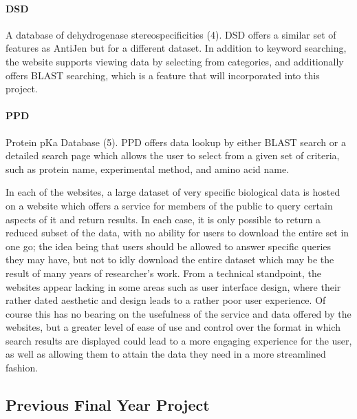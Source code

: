 \documentclass[12pt,a4paper]{article}
\begin{document}
\paragraph{DSD} A database of dehydrogenase stereospecificities (4). DSD offers
a similar set of features as AntiJen but for a different dataset. In addition to
keyword searching, the website supports viewing data by selecting from
categories, and additionally offers BLAST searching, which is a feature that
will incorporated into this project.

\paragraph{PPD} Protein pKa Database (5). PPD offers data lookup by either
BLAST search or a detailed search page which allows the user to select from a
given set of criteria, such as protein name, experimental method, and amino acid
name.

In each of the websites, a large dataset of very specific biological data is
hosted on a website which offers a service for members of the public to query
certain aspects of it and return results. In each case, it is only possible to
return a reduced subset of the data, with no ability for users to download the
entire set in one go; the idea being that users should be allowed to answer
specific queries they may have, but not to idly download the entire dataset
which may be the result of many years of researcher’s work. From a technical
standpoint, the websites appear lacking in some areas such as user interface
design, where their rather dated aesthetic and design leads to a rather poor
user experience. Of course this has no bearing on the usefulness of the service
and data offered by the websites, but a greater level of ease of use and control
over the format in which search results are displayed could lead to a more
engaging experience for the user, as well as allowing them to attain the data
they need in a more streamlined fashion.

\subsection{Previous Final Year Project}
\end{document}
